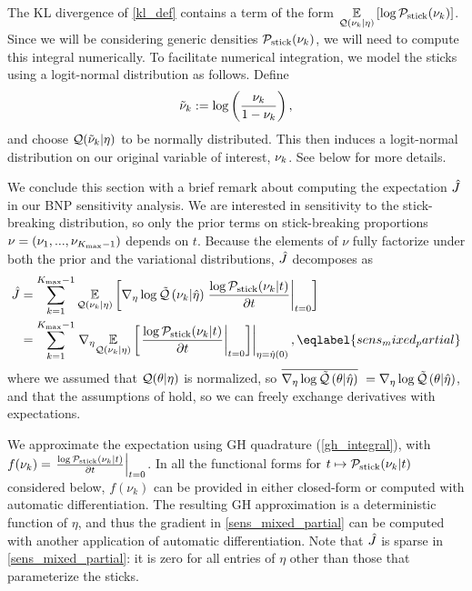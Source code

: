 The KL divergence of \eqref{kl_def} contains a term of the form $\underset{\mathcal{Q}(\nu_{k}
\vert \eta)}{\mathbb{E}}\left[\log \mathcal{P}_{\mathrm{stick}}(\nu_{k})\right]$.  Since we will be considering generic
densities $\mathcal{P}_{\mathrm{stick}}(\nu_{k})$, we will need to compute this integral numerically.
To facilitate numerical integration, we model the sticks using a logit-normal
distribution as follows.  Define
%
\begin{align*}
%
\lnuk := \log\left(\frac{\nuk}{1 - \nuk}\right),
%
\end{align*}
%
and choose $\mathcal{Q}(\tilde{\nu}_k \vert \eta)$ to be normally distributed.  This then
induces a logit-normal distribution on our original variable of interest,
$\nu_{k}$.  See  below for more details.




\hrulefill





We conclude this section with a brief remark about computing the expectation
$\hat J$ in our BNP sensitivity analysis.
We are interested in sensitivity to the stick-breaking distribution,
so only the prior terms on stick-breaking proportions
$\nu = (\nu_1, ..., \nu_{{K_{\mathrm{max}}} - 1})$ depends on $t$.
Because the elements of $\nu$ fully factorize
under both the prior and the variational distributions,
$\hat J$ decomposes as
\begin{align}
  \crosshessian &=
  \sum_{\k=1}^{\kmax - 1}
          \expect{\q(\nuk \vert \eta)}
                 {
                 \lqgrad{\nuk \vert \etaopt}
                 \fracat{\log \pstick(\nuk \vert \t)}{\partial \t}{\t = 0}
                 } \notag\\
  &= \sum_{\k=1}^{\kmax - 1}
         \evalat{\nabla_\eta \expect{\q(\nuk \vert \eta)}
                {
                \fracat{\log \pstick(\nuk \vert \t)}{\partial \t}{\t = 0}
                }}{\eta = \etaopt(0)},
\eqlabel{sens_mixed_partial}
\end{align}
where we assumed that $\mathcal{Q}(\theta \vert \eta)$ is normalized, so
$\overline{{\nabla_\eta \log \tilde{\mathcal{Q}}}\left(\theta \vert \hat\eta\right)}\,\, = {\nabla_\eta \log \tilde{\mathcal{Q}}}\left(\theta \vert \hat\eta\right)$,
and that the assumptions of  hold, so we
can freely exchange derivatives with expectations.

We approximate the expectation using GH quadrature (\eqref{gh_integral}), with
$f(\nu_k) = \left.\frac{\log \mathcal{P}_{\mathrm{stick}}(\nu_{k} \vert t)}{\partial t}\right\vert_{t = 0}$. In all
the functional forms for $t \mapsto \mathcal{P}_{\mathrm{stick}}(\nu_{k} \vert t)$ considered below,
$f(\nu_k)$ can be provided in either closed-form or computed with automatic
differentiation. The resulting GH approximation is a deterministic function of
$\eta$, and thus the gradient in \eqref{sens_mixed_partial} can be computed with
another application of automatic differentiation. Note that $\hat J$ is
sparse in \eqref{sens_mixed_partial}: it is zero for all entries of $\eta$ other
than those that parameterize the sticks.


